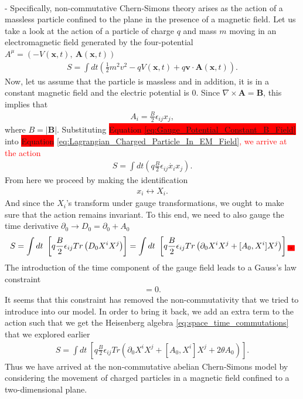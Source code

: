     \\ 
    - Specifically, non-commutative Chern-Simons theory arises as the action of a massless particle confined to the plane in the presence of a magnetic field. \cite{hep-th/0103013} Let us take a look at the action of a particle of charge $q$ and mass $m$ moving in an electromagnetic field generated by the four-potential $A^{\mu} = \left(-V(\bm{x}, t), \ \bm{A}(\bm{x},t)\right)$
    \begin{align}
        S = \int dt \left(\frac{1}{2} m^2 v^2 - q V(\bm{x},t) + q \bm{v} \cdot \bm{A}(\bm{x},t)\right). \label{eq:Lagrangian_Charged_Particle_In_EM_Field}
    \end{align}
    Now, let us assume that the particle is massless and in addition, it is in a constant magnetic field and the electric potential is 0. Since $\nabla \times \bm{A} = \bm{B}$, this implies that
    \begin{align}
        A_i = \frac{B}{2} \epsilon_{i j} x_j \label{eq:Gauge_Potential_Constant_B_Field},
    \end{align}
    where $B= |\bm{B}|$.
    Substituting  \colorbox{red}{Equation \eqref{eq:Gauge_Potential_Constant_B_Field}}  into \colorbox{red}{Equation} \eqref{eq:Lagrangian_Charged_Particle_In_EM_Field}\textcolor{red}{, we arrive at the action}
    \begin{align}
        S = \int dt \left( q \frac{B}{2}\epsilon_{i j} \dot{x_i} x_j \right).
    \end{align}
    From here we proceed by making the identification
    \begin{align}
        x_i \leftrightarrow X_i.
    \end{align}
    And since the $X_i$'s transform under gauge transformations, we ought to make sure that the action remains invariant. To this end, we need to also gauge the time derivative $\partial_0 \rightarrow D_0 = \partial_0 +A_0$
    \begin{align}
        S = \int dt \ \left[ q \frac{B}{2} \epsilon_{ij} Tr \left(D_0 X^i X^j \right) \right] = \int dt \ \left[ q \frac{B}{2} \epsilon_{ij} Tr \left(\partial_0 X^i X^j + [A_0, X^i] X^j \right) \right]\colorbox{red}{.}
    \end{align}
    The introduction of the time component of the gauge field leads to a Gauss's law constraint
    \begin{align}
        [X^1, X^2] =0.
    \end{align}
    It seems that this constraint has removed the non-commutativity that we tried to introduce into our model. In order to bring it back, we add an extra term to the action such that we get the Heisenberg algebra \eqref{eq:space_time_commutations} that we explored earlier
    \begin{align}
        S =\int dt \ \left[ q \frac{B}{2} \epsilon_{ij} Tr \left(\partial_0 X^i X^j + [A_0, X^i] X^j + 2 \theta A_0 \right) \right].
    \end{align}
    Thus we have arrived at the non-commutative abelian Chern-Simons model by considering the movement of charged particles in a magnetic field confined to a two-dimensional plane.

    

